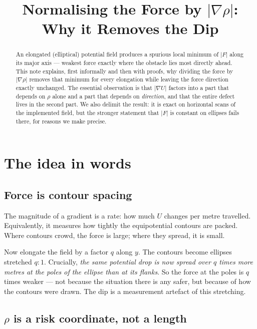 \documentclass[11pt]{article}
\title{Normalising the Force by $|\nabla\rho|$:\\
       Why it Removes the Dip}
\author{}
\date{}
\theoremstyle{remark}
\begin{document}
\maketitle

\begin{abstract}
An elongated (elliptical) potential field produces a spurious local minimum
of $|F|$ along its major axis --- weakest force exactly where the obstacle
lies most directly ahead. This note explains, first informally and then with
proofs, why dividing the force by $|\nabla\rho|$ removes that minimum for
every elongation while leaving the force direction exactly unchanged. The
essential observation is that $|\nabla U|$ factors into a part that depends
on $\rho$ alone and a part that depends on \emph{direction}, and that the
entire defect lives in the second part. We also delimit the result: it is
exact on horizontal scans of the implemented field, but the stronger
statement that $|F|$ is constant on ellipses fails there, for reasons we make
precise.
\end{abstract}

\section{The idea in words}
\label{sec:intuition}

\subsection{Force is contour spacing}

The magnitude of a gradient is a rate: how much $U$ changes per metre
travelled. Equivalently, it measures how tightly the equipotential contours
are packed. Where contours crowd, the force is large; where they spread, it
is small.

Now elongate the field by a factor $q$ along $y$. The contours become
ellipses stretched $q:1$. Crucially, \emph{the same potential drop is now
spread over $q$ times more metres at the poles of the ellipse than at its
flanks}. So the force at the poles is $q$ times weaker --- not because the
situation there is any safer, but because of how the contours were drawn. The
dip is a measurement artefact of this stretching.

\subsection{$\rho$ is a risk coordinate, not a length}
\end{document}
